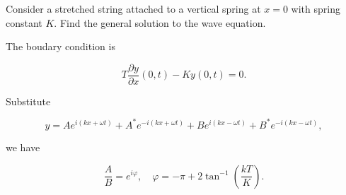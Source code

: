 \documentclass[a4paper,12pt]{report}
\begin{document}
{Consider a stretched string attached to a vertical spring at \(x=0\) with spring constant \(K\). Find the general solution to the wave equation. }
{The boudary condition is 

\begin{equation}
	T \frac{\partial y}{\partial x} (0,t) - K y(0,t) = 0. 
\end{equation}

Substitute 

\begin{equation}
	y = A e^{i (kx+\omega t)} + A^* e^{-i (kx+\omega t)} + B e^{i (kx-\omega t)} + B^* e^{-i (kx-\omega t)},  
\end{equation}

we have

\begin{equation}
	\frac{A}{B} = e^{i \varphi }, \quad \varphi  = - \pi + 2\tan ^{-1} \left( \frac{kT}{K}  \right).
\end{equation}

} 
\end{document}
